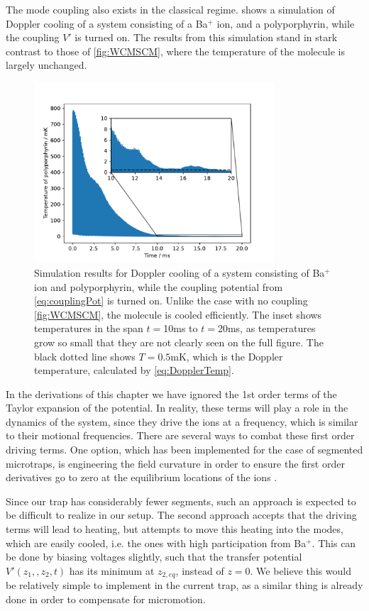 The mode coupling also exists in the classical regime.  shows a simulation of Doppler cooling of a system consisting of a  Ba$^+$ ion, and a polyporphyrin, while the coupling $V'$ is turned on. The results from this simulation stand in stark contrast to those of \cref{fig:WCMSCM}, where the temperature of the molecule is largely unchanged.
\begin{figure}[h]
    \centering
    \includegraphics[width = 0.8\textwidth]{main/PolyPorCooling.pdf}
    \caption{Simulation results for Doppler cooling of a system consisting of Ba$^+$ ion and polyporphyrin, while the coupling potential from \cref{eq:couplingPot} is turned on. Unlike the case with no coupling \cref{fig:WCMSCM}, the molecule is cooled efficiently.
    The inset shows temperatures in the span $ t = $10ms to $t = $20ms, as temperatures grow so small that they are not clearly seen on the full figure. The black dotted line shows $T = 0.5$mK, which is the Doppler temperature, calculated by \cref{eq:DopplerTemp}.}
    \label{fig:polyPorCooling}
\end{figure}

In the derivations of this chapter we have ignored the 1st order terms of the Taylor expansion of the potential. In reality, these terms will play a role in the dynamics of the system, since they drive the ions at a frequency, which is similar to their motional frequencies. There are several ways to combat these first order driving terms.
One option, which has been implemented for the case of segmented microtraps, is engineering the field curvature in order to ensure the first order derivatives go to zero at the equilibrium locations of the ions \cite{WeaklyCoupled}. 

Since our trap has considerably fewer segments, such an approach is expected to be difficult to realize in our setup.
The second approach accepts that the driving terms will lead to heating, but attempts to move this heating into the modes, which are easily cooled, i.e. the ones with high participation from Ba$^+$. This can be done by biasing voltages slightly, such that the transfer potential $V'(z_1,,z_2,t)$ has its minimum at $z_{2,eq}$, instead of $z=0$.
We believe this would be relatively simple to implement in the current trap, as a similar thing is already done in order to compensate for micromotion.



